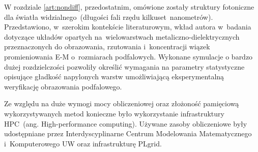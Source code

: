 W rozdziale \ref{art:nondiff}, przedostatnim,  omówione zostały struktury fotoniczne dla światła widzialnego~(długości fali rzędu kilkuset~nanometrów). Przedstawiono, w~szerokim kontekście literaturowym, wkład autora w~badania dotyczące układów opartych na~wielowarstwach metaliczno-dielektrycznych przeznaczonych do obrazowania, rzutowania i~koncentracji wiązek promieniowania E-M o~rozmiarach podfalowych. Wykonane symulacje o bardzo dużej rozdzielczości pozwoliły określić wymagania na parametry statystyczne opisujące gładkość napylonych warstw umożliwiającą eksperymentalną weryfikację obrazowania podfalowego.

Ze względu na duże wymogi mocy obliczeniowej oraz złożoność pamięciową wykorzystywanych metod konieczne było wykorzystanie infrastruktury HPC~(ang. High-performance computing). Używane zasoby obliczeniowe były udostępniane przez Interdyscyplinarne Centrum Modelowania Matematycznego i~Komputerowego UW oraz infrastrukturę PLgrid. 

